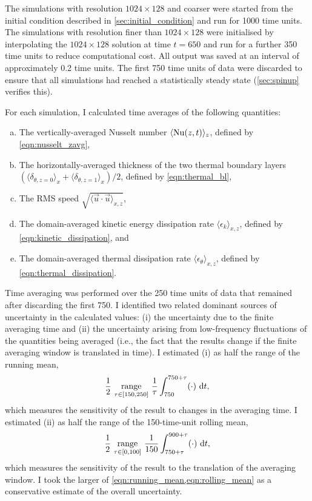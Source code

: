 \documentclass[../main.tex]{subfiles}
\begin{document}
The simulations with resolution $1024 \times 128$ and coarser were started from
the initial condition described in \cref{sec:initial_condition} and run for
1000 time units. The simulations with resolution finer than $1024 \times 128$
were initialised by interpolating the $1024 \times 128$ solution at time $t =
650$ and run for a further 350 time units to reduce computational cost. All
output was saved at an interval of approximately 0.2 time units. The first 750
time units of data were discarded to ensure that all simulations had reached a
statistically steady state (\cref{sec:spinup} verifies this).

For each simulation, I calculated time averages of the following quantities:
\begin{enumerate}[a.]
    \item The vertically-averaged Nusselt number
        $\langle \mathrm{Nu}(z,t) \rangle _z$, defined by \cref{eqn:nusselt_zavg},
    \item The horizontally-averaged thickness of the two thermal boundary
        layers $( \langle \delta_{\theta, z=0} \rangle _x
        + \langle \delta_{\theta, z=1} \rangle _x )/2$, defined by
        \cref{eqn:thermal_bl},
    \item The RMS speed $\sqrt{\langle \vec{u} \cdot \vec{u} \rangle _{x,z}}$,
    \item The domain-averaged kinetic energy dissipation rate $\langle
        \epsilon_k \rangle _{x,z}$, defined by \cref{eqn:kinetic_dissipation},
        and
    \item The domain-averaged thermal dissipation rate $\langle \epsilon_\theta
        \rangle _{x,z}$, defined by \cref{eqn:thermal_dissipation}.
\end{enumerate}

Time averaging was performed over the 250 time units of data that remained
after discarding the first 750. I identified two related dominant sources of
uncertainty in the calculated values: (i) the uncertainty due to the finite
averaging time and (ii) the uncertainty arising from low-frequency fluctuations
of the quantities being averaged (i.e., the fact that the results change if the
finite averaging window is translated in time). I estimated (i) as half the
range of the running mean,
\begin{equation} \label{eqn:running_mean}
    \frac{1}{2} ~ \underset{\tau \in [150, 250]}{\operatorname{range}} ~
        \frac{1}{\tau} \int_{750}^{750 + \tau} (\cdot) ~\mathrm{d}t,
\end{equation}
which measures the sensitivity of the result to changes in the averaging time.
I estimated (ii) as half the range of the 150-time-unit rolling mean,
\begin{equation} \label{eqn:rolling_mean}
    \frac{1}{2} ~ \underset{\tau \in [0, 100]}{\operatorname{range}} ~
        \frac{1}{150} \int_{750 + \tau}^{900 + \tau} (\cdot) ~\mathrm{d}t,
\end{equation}
which measures the sensitivity of the result to the translation of the
averaging window. I took the larger of \cref{eqn:running_mean,eqn:rolling_mean}
as a conservative estimate of the overall uncertainty.
\end{document}
